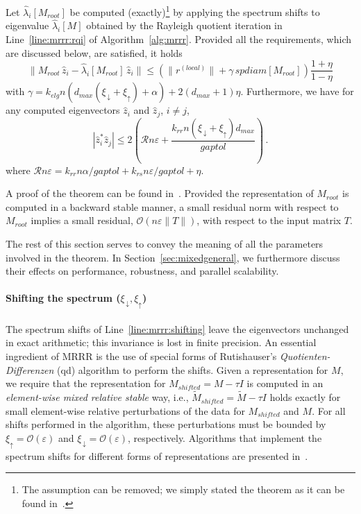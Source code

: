 \documentclass[final]{siamltex}
\newcommand\norm[1]{\lVert#1\rVert}
\newcommand\order[1]{\mathcal{O}(#1)}
\begin{document}
\begin{theorem}[Accuracy] 
Let $\hat{\lambda}_i[M_{root}]$ be computed (exactly)\footnote{The
  assumption can be removed; we simply stated the theorem as it can be found
in~\cite{Willems:Diss,Willems:framework}.} by applying the
spectrum shifts to eigenvalue $\hat{\lambda}_i[M]$ obtained by the Rayleigh quotient
iteration in Line~\ref{line:mrrr:rqi} of Algorithm~\ref{alg:mrrr}.  
Provided all the requirements, which are discussed below, are satisfied, it holds
\begin{equation*}
\norm{M_{root}\, \hat{z}_i - \hat{\lambda}_i[M_{root}]  \, \hat{z}_i} \leq
\left( \norm{r^{(local)}} + \gamma \, spdiam[M_{root}] \right)
\frac{1+\eta}{1-\eta}
\label{residualbound}
\end{equation*}
with $\gamma = k_{elg} n \left( d_{max}(\xi_{\,\downarrow} + \xi_{\uparrow})
  +  \alpha \right) + 2(d_{max} +1) \eta$. 
Furthermore, we have for any computed eigenvectors $\hat{z}_i$ and $\hat{z}_j$, $i \neq j$, 
\begin{equation*}
|\hat{z}_i^* \hat{z}_j| \leq 2 \left( \mathcal{R} n \varepsilon +  \frac{k_{rr}
  n (\xi_{\,\downarrow} + \xi_{\uparrow}) d_{max}}{gaptol} \right) \,.
\label{orthogonalitybound}
\end{equation*}
where $\mathcal{R} n \varepsilon = k_{rr} n \alpha / gaptol + k_{rs} n
\varepsilon/gaptol + \eta$.
\label{resthm}
\end{theorem}
A proof of the theorem can be found
in~\cite{Willems:Diss,Willems:framework}. 
Provided the representation of
$M_{root}$ is computed in a backward stable manner, a small residual norm with
respect to $M_{root}$ implies a small residual, 
$\order{n\varepsilon \norm{T}}$, with respect to the input matrix $T$. 

The rest of this section serves to convey the meaning of all the
parameters involved in the theorem. In Section~\ref{sec:mixedgeneral}, we
furthermore discuss their effects on performance, robustness,
and parallel scalability.  

\paragraph{Shifting the spectrum ($\xi_{\,\downarrow}, \xi_{\uparrow}$)}
The spectrum shifts of Line~\ref{line:mrrr:shifting} leave the eigenvectors 
unchanged in exact arithmetic; this invariance is lost in finite precision. An essential
ingredient of MRRR is the use of special forms of Rutishauser's {\it
  Quotienten-Differenzen} (qd) algorithm to perform the shifts. 
Given a representation for $M$, we require that the representation
for $M_{shifted} = M - \tau I$ is computed in an {\it element-wise mixed relative 
stable} way, i.e., $\widetilde{M}_{shifted} = \widetilde{M} - \tau I$ holds
exactly for small element-wise relative perturbations of the data for
$M_{shifted}$ and $M$. For all shifts performed in the algorithm, these
perturbations must be bounded by   
$\xi_{\uparrow} = \order{\varepsilon}$ and $\xi_{\,\downarrow} =
\order{\varepsilon}$, respectively. Algorithms that implement the spectrum
shifts for different forms of representations are presented
in~\cite{Dhillon:2004:Ortvecs,Willems:twisted,Willems:blocked}. 
\end{document}
